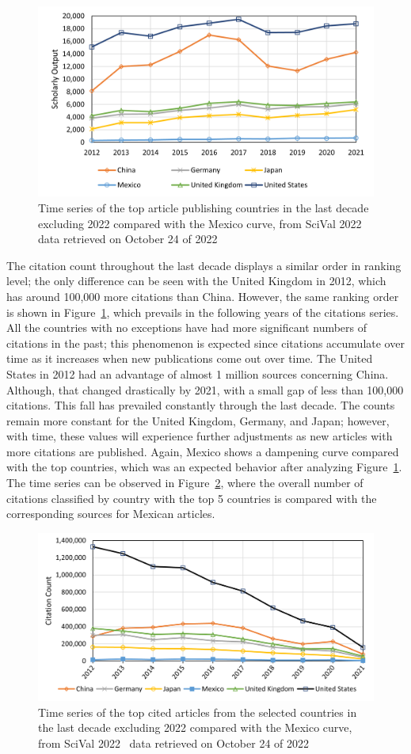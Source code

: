 \documentclass[conference]{IEEEtran}
\begin{document}
\begin{figure}[H]
    \centering
    \includegraphics[width = 8 cm]{CountriesData.png}
    \caption{Time series of the top article publishing countries in the last decade excluding 2022 compared with the Mexico curve, from SciVal 2022~\cite{Scival2022} data retrieved on October 24 of 2022}
    \label{fig:CountriesData}
\end{figure}

The citation count throughout the last decade displays a similar order in ranking level; the only difference can be seen with the United Kingdom in 2012, which has around 100,000 more citations than China. However, the same ranking order is shown in Figure~\ref{fig:CountriesData}, which prevails in the following years of the citations series. All the countries with no exceptions have had more significant numbers of citations in the past; this phenomenon is expected since citations accumulate over time as it increases when new publications come out over time. The United States in 2012 had an advantage of almost 1 million sources concerning China. Although, that changed drastically by 2021, with a small gap of less than 100,000 citations. This fall has prevailed constantly through the last decade. The counts remain more constant for the United Kingdom, Germany, and Japan; however, with time, these values will experience further adjustments as new articles with more citations are published. Again, Mexico shows a dampening curve compared with the top countries, which was an expected behavior after analyzing Figure~\ref{fig:CountriesData}. The time series can be observed in  Figure~\ref{fig:CountriesCitations}, where the overall number of citations classified by country with the top 5 countries is compared with the corresponding sources for Mexican articles.

\begin{figure}[H]
    \centering
    \includegraphics[width = 8 cm]{CountriesCitations.png}
    \caption{Time series of the top cited articles from the selected countries in the last decade excluding 2022 compared with the Mexico curve, from SciVal 2022~\cite{Scival2022} data retrieved on October 24 of 2022}
    \label{fig:CountriesCitations}
\end{figure}
\end{document}
